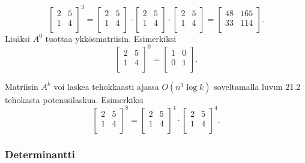 \[
 \begin{bmatrix}
  2 & 5 \\
  1 & 4 \\
 \end{bmatrix}^3 =
 \begin{bmatrix}
  2 & 5 \\
  1 & 4 \\
 \end{bmatrix} \cdot
 \begin{bmatrix}
  2 & 5 \\
  1 & 4 \\
 \end{bmatrix} \cdot
 \begin{bmatrix}
  2 & 5 \\
  1 & 4 \\
 \end{bmatrix} =
 \begin{bmatrix}
  48 & 165 \\
  33 & 114 \\
 \end{bmatrix}.
\]
Lisäksi $A^0$ tuottaa ykkösmatriisin. Esimerkiksi
\[
 \begin{bmatrix}
  2 & 5 \\
  1 & 4 \\
 \end{bmatrix}^0 =
 \begin{bmatrix}
  1 & 0 \\
  0 & 1 \\
 \end{bmatrix}.
\]

Matriisin $A^k$ voi laskea tehokkaasti ajassa
$O(n^3 \log k)$ soveltamalla luvun 21.2
tehokasta potenssilaskua. Esimerkiksi
\[
 \begin{bmatrix}
  2 & 5 \\
  1 & 4 \\
 \end{bmatrix}^8 =
 \begin{bmatrix}
  2 & 5 \\
  1 & 4 \\
 \end{bmatrix}^4 \cdot
 \begin{bmatrix}
  2 & 5 \\
  1 & 4 \\
 \end{bmatrix}^4.
\]


\subsubsection{Determinantti}

